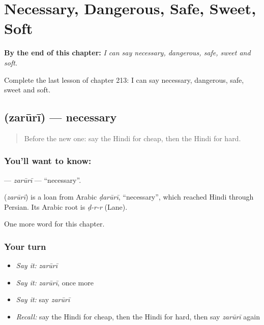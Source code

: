 
\chapter{Necessary, Dangerous, Safe, Sweet, Soft}
\label{ch:hi-necessary-dangerous-safe-sweet-soft}

\begin{chapteropening}
\textbf{By the end of this chapter:} \emph{I can say necessary, dangerous, safe, sweet and soft.}

Complete the last lesson of chapter 213: I can say necessary, dangerous, safe, sweet and soft.
\end{chapteropening}

\section[\texorpdfstring{\hi{ज़रूरी} (zarūrī)}{ज़रूरी (zarūrī)}]{ (zarūrī) — necessary}

\label{lesson:HI-C213-zaruri}



\begin{quote}
Before the new one: say the Hindi for cheap, then the Hindi for hard.
\end{quote}

\subsection*{You'll want to know: }
\textbf{} — \emph{zarūrī} — \textquotedblleft{}necessary\textquotedblright{}.

\begin{cousinweb}
\textbf{} (\emph{zarūrī}) is a loan from Arabic \emph{ḍarūrī}, \textquotedblleft{}necessary\textquotedblright{}, which reached Hindi through Persian. Its Arabic root is \emph{ḍ-r-r} (Lane).
\end{cousinweb}

\begin{grammarlens}[title={What you've built}]
One more word for this chapter.
\end{grammarlens}

\subsection*{Your turn}
\begin{itemize}
\raggedright
  \item \emph{Say it:} \emph{zarūrī}
  \item \emph{Say it:} \emph{zarūrī}, once more
  \item \emph{Say it:} say \emph{zarūrī}
  \item \emph{Recall:} say the Hindi for cheap, then the Hindi for hard, then say \emph{zarūrī} again
\end{itemize}

